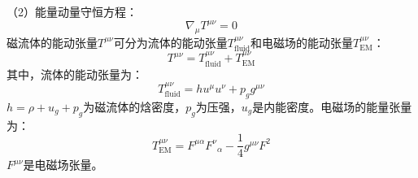 \documentclass[lang=cn,color=blue,cm,11pt,scheme=chinese,bibend=bibtex,sorting=nty]{elegantbook}
\begin{document}
	（2）能量动量守恒方程：
	\begin{equation}
		\nabla_{\mu} T^{\mu \nu} = 0
	\end{equation}
	磁流体的能动张量$T^{\mu \nu}$可分为流体的能动张量$T^{\mu \nu}_{\text{fluid}}$和电磁场的能动张量$T_{\text{EM}}^{\mu \nu}$：
	\begin{equation}
		T^{\mu \nu} = T^{\mu \nu}_{\text{fluid}} + T_{\text{EM}}^{\mu \nu}
	\end{equation}
	其中，流体的能动张量为：
	\begin{equation}
		T^{\mu \nu}_{\text{fluid}} = h u^{\mu} u^{\nu} + p_g g^{\mu \nu}
	\end{equation}
	$h = \rho + u_g + p_g$为磁流体的焓密度，$p_g$为压强，$u_g$是内能密度。电磁场的能量张量为：
	\begin{equation}
		T_{\text{EM}}^{\mu \nu} = F^{\mu \alpha} F^{\nu}{}_{\alpha} - \frac{1}{4} g^{\mu \nu} F^2
	\end{equation}
	$F^{\mu \nu}$是电磁场张量。
	
\end{document}
